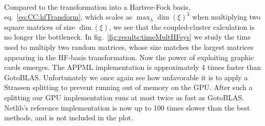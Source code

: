\paragraph{}
Compared to the transformation into a Hartree-Fock basis, eq.~\eqref{eq:CC:hfTransform}, which scales as $ \max_{\lambda}\dim(\xi)^3$ when multiplying two square matrices of size $\dim(\xi)$, we see that the coupled-cluster calculation is no longer the bottleneck.
In fig.~\ref{fig:results:timeMultHFsys} we study the time used to multiply two random matrices, whose size matches the largest matrices appearing in the HF-basis transformation.
Now the power of exploiting graphic cards emerges.
The APPML implementation is approximately 4 times faster than GotoBLAS.
Unfortunately we once again see how unfavorable it is to apply a Strassen splitting to prevent running out of memory on the GPU.
After such a splitting our GPU implementation runs at most twice as fast as GotoBLAS.
Netlib's reference implementation is now up to 100 times slower than the best methods, and is not included in the plot.
